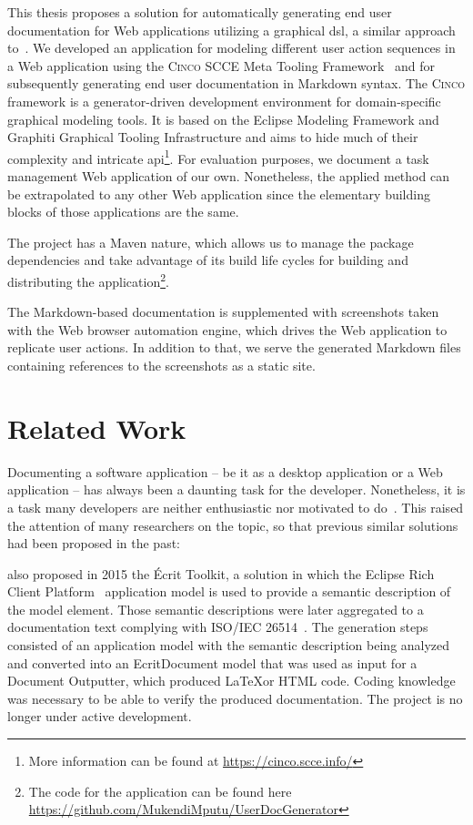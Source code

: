 This thesis proposes a solution for automatically generating end user documentation for Web applications utilizing a graphical \gls*{dsl}, a similar approach to~\cite{bosselmann-et_al}. We developed an application for modeling different user action sequences in a Web application using the \textsc{Cinco} SCCE Meta Tooling Framework~\cite{Cinco} and for subsequently generating end user documentation in Markdown syntax. The \textsc{Cinco} framework is a generator-driven development environment for domain-specific graphical modeling tools. It is based on the Eclipse Modeling Framework and Graphiti Graphical Tooling Infrastructure and aims to hide much of their complexity and intricate \gls{api}\footnote{More information can be found at \url{https://cinco.scce.info/}}. For evaluation purposes, we document a task management Web application of our own. Nonetheless, the applied method can be extrapolated to any other Web application since the elementary building blocks of those applications are the same.

The project has a Maven nature, which allows us to manage the package dependencies and take advantage of its build life cycles for building and distributing the application\footnote{The code for the application can be found here \url{https://github.com/MukendiMputu/UserDocGenerator}}.

The Markdown-based documentation is supplemented with screenshots taken with the Web browser automation engine, which drives the Web application to replicate user actions. In addition to that, we serve the generated Markdown files containing references to the screenshots as a static site.

\section{Related Work}\label{sec:relWork}

Documenting a software application -- be it as a desktop application or a Web application -- has always been a daunting task for the developer. Nonetheless, it is a task many developers are neither enthusiastic nor motivated to do~\cite{kipyegen2013importance}. This raised the attention of many researchers on the topic, so that previous similar solutions had been proposed in the past:

\cite{descher_et-al} also proposed in 2015 the Écrit Toolkit, a solution in which the Eclipse Rich Client Platform~\cite{eclipseRCP} application model is used to provide a semantic description of the model element. Those semantic descriptions were later aggregated to a documentation text complying with ISO/IEC 26514~\cite{descher_et-al}. The generation steps consisted of an application model with the semantic description being analyzed and converted into an EcritDocument model that was used as input for a Document Outputter, which produced \LaTeX or HTML code. Coding knowledge was necessary to be able to verify the produced documentation. The project is no longer under active development.

